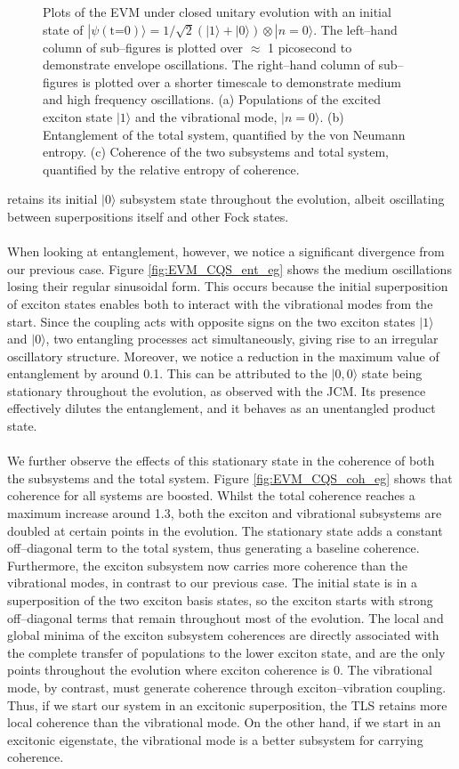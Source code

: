 \documentclass[11pt]{article}
\begin{document}
\begin{figure}[H]
    \caption{Plots of the EVM under closed unitary evolution with an initial state of $|\psi (\text{t=0})\rangle = 1/\sqrt{2}(|1\rangle + |0\rangle)\otimes|n=0\rangle$. The left--hand column of sub--figures is plotted over $\approx$ 1 picosecond to demonstrate envelope oscillations. The right--hand column of sub--figures is plotted over a shorter timescale to demonstrate medium and high frequency oscillations. (a) Populations of the excited exciton state $|1\rangle$ and the vibrational mode, $|n=0\rangle$. (b) Entanglement of the total system, quantified by the von Neumann entropy. (c) Coherence of the two subsystems and total system, quantified by the relative entropy of coherence.} 
    \label{fig:EVM_CQS_eg}
\end{figure}

\noindent retains its initial $|0\rangle$ subsystem state throughout the evolution, albeit oscillating between superpositions itself and other Fock states. \\
\\
When looking at entanglement, however, we notice a significant divergence from our previous case. Figure \ref{fig:EVM_CQS_ent_eg} shows the medium oscillations losing their regular sinusoidal form. This occurs because the initial superposition of exciton states enables both to interact with the vibrational modes from the start. Since the coupling acts with opposite signs on the two exciton states $|1\rangle$ and $|0\rangle$, two entangling processes act simultaneously, giving rise to an irregular oscillatory structure. Moreover, we notice a reduction in the maximum value of entanglement by around 0.1. This can be attributed to the $|0,0\rangle$ state being stationary throughout the evolution, as observed with the JCM. Its presence effectively dilutes the entanglement, and it behaves as an unentangled product state. \\
\\
We further observe the effects of this stationary state in the coherence of both the subsystems and the total system. Figure \ref{fig:EVM_CQS_coh_eg} shows that coherence for all systems are boosted. Whilst the total coherence reaches a maximum increase around 1.3, both the exciton and vibrational subsystems are doubled at certain points in the evolution. The stationary state adds a constant off--diagonal term to the total system, thus generating a baseline coherence. Furthermore, the exciton subsystem now carries more coherence than the vibrational modes, in contrast to our previous case. The initial state is in a superposition of the two exciton basis states, so the exciton starts with strong off--diagonal terms that remain throughout most of the evolution. The local and global minima of the exciton subsystem coherences are directly associated with the complete transfer of populations to the lower exciton state, and are the only points throughout the evolution where exciton coherence is 0. The vibrational mode, by contrast, must generate coherence through exciton--vibration coupling. Thus, if we start our system in an excitonic superposition, the TLS retains more local coherence than the vibrational mode. On the other hand, if we start in an excitonic eigenstate, the vibrational mode is a better subsystem for carrying coherence. \\
\end{document}

